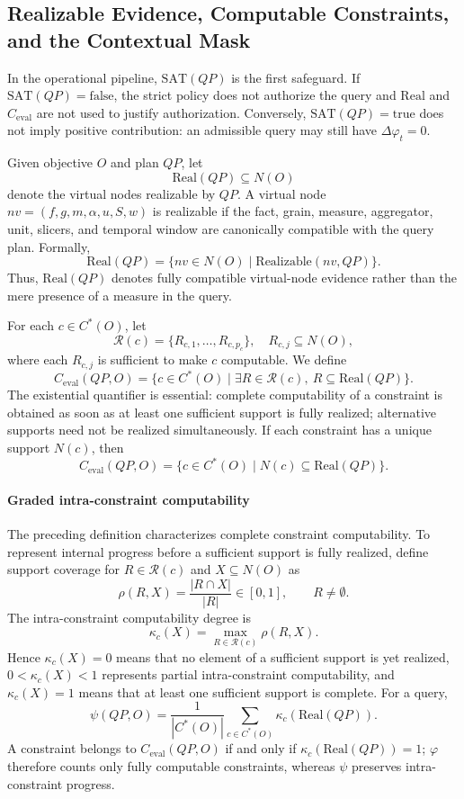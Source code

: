 \documentclass[journal]{IEEEtran}
\begin{document}
\subsection{Realizable Evidence, Computable Constraints, and the Contextual Mask}

In the operational pipeline, $\mathrm{SAT}(QP)$ is the first safeguard. If $\mathrm{SAT}(QP)=\mathrm{false}$, the strict policy does not authorize the query and $\mathrm{Real}$ and $C_{\mathrm{eval}}$ are not used to justify authorization. Conversely, $\mathrm{SAT}(QP)=\mathrm{true}$ does not imply positive contribution: an admissible query may still have $\Delta\varphi_t=0$.

Given objective $O$ and plan $QP$, let
\[
\mathrm{Real}(QP)\subseteq N(O)
\]
denote the virtual nodes realizable by $QP$. A virtual node $nv=(f,g,m,\alpha,u,S,w)$ is realizable if the fact, grain, measure, aggregator, unit, slicers, and temporal window are canonically compatible with the query plan. Formally,
\[
\mathrm{Real}(QP)=\{nv\in N(O)\mid \mathrm{Realizable}(nv,QP)\}.
\]
Thus, $\mathrm{Real}(QP)$ denotes fully compatible virtual-node evidence rather than the mere presence of a measure in the query.

For each $c\in C^*(O)$, let
\[
\mathcal{R}(c)=\{R_{c,1},\dots,R_{c,p_c}\},\quad R_{c,j}\subseteq N(O),
\]
where each $R_{c,j}$ is sufficient to make $c$ computable. We define
\[
C_{\mathrm{eval}}(QP,O)=\{c\in C^*(O)\mid \exists R\in \mathcal{R}(c),\ R\subseteq \mathrm{Real}(QP)\}.
\]
The existential quantifier is essential: complete computability of a constraint is obtained as soon as at least one sufficient support is fully realized; alternative supports need not be realized simultaneously. If each constraint has a unique support $N(c)$, then
\[
C_{\mathrm{eval}}(QP,O)=\{c\in C^*(O)\mid N(c)\subseteq \mathrm{Real}(QP)\}.
\]

\paragraph*{Graded intra-constraint computability}
The preceding definition characterizes complete constraint computability. To represent internal progress before a sufficient support is fully realized, define support coverage for $R\in\mathcal R(c)$ and $X\subseteq N(O)$ as
\[
\rho(R,X)=\frac{|R\cap X|}{|R|}\in[0,1],\qquad R\neq\emptyset.
\]
The intra-constraint computability degree is
\[
\kappa_c(X)=\max_{R\in\mathcal R(c)}\rho(R,X).
\]
Hence $\kappa_c(X)=0$ means that no element of a sufficient support is yet realized, $0<\kappa_c(X)<1$ represents partial intra-constraint computability, and $\kappa_c(X)=1$ means that at least one sufficient support is complete. For a query,
\[
\psi(QP,O)=\frac{1}{|C^*(O)|}\sum_{c\in C^*(O)}\kappa_c(\mathrm{Real}(QP)).
\]
A constraint belongs to $C_{\mathrm{eval}}(QP,O)$ if and only if $\kappa_c(\mathrm{Real}(QP))=1$; $\varphi$ therefore counts only fully computable constraints, whereas $\psi$ preserves intra-constraint progress.
\end{document}
